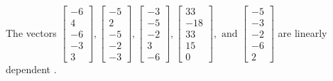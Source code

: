 \begin{exercise}
\begin{exerciseStatement}
  \end{exerciseStatement}
  \begin{exerciseAnswer}
   The vectors \(\left[\begin{array}{r}
-6 \\
4 \\
-6 \\
-3 \\
3
\end{array}\right] , \left[\begin{array}{r}
-5 \\
2 \\
-5 \\
-2 \\
-3
\end{array}\right] , \left[\begin{array}{r}
-3 \\
-5 \\
-2 \\
3 \\
-6
\end{array}\right] , \left[\begin{array}{r}
33 \\
-18 \\
33 \\
15 \\
0
\end{array}\right] , \text{ and } \left[\begin{array}{r}
-5 \\
-3 \\
-2 \\
-6 \\
2
\end{array}\right]\) are 
  	 linearly dependent  .
  


  \end{exerciseAnswer}
\end{exercise}